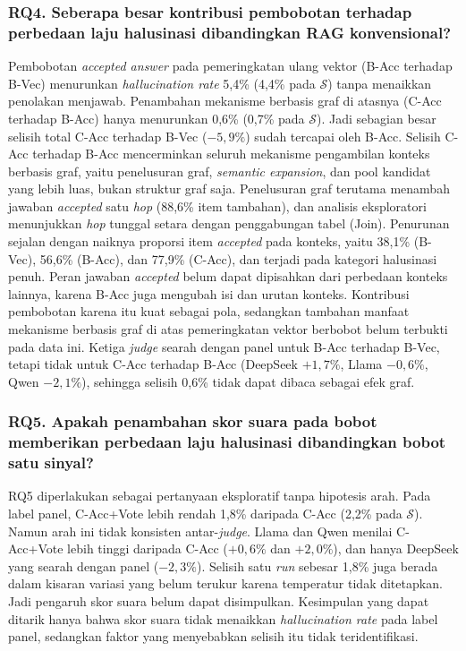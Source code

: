 \subsubsection*{RQ4. Seberapa besar kontribusi pembobotan terhadap perbedaan laju halusinasi dibandingkan RAG konvensional?}

Pembobotan \emph{accepted answer} pada pemeringkatan ulang vektor (B-Acc terhadap B-Vec) menurunkan \emph{hallucination rate} 5,4\% (4,4\% pada $\mathcal{S}$) tanpa menaikkan penolakan menjawab. Penambahan mekanisme berbasis graf di atasnya (C-Acc terhadap B-Acc) hanya menurunkan 0,6\% (0,7\% pada $\mathcal{S}$). Jadi sebagian besar selisih total C-Acc terhadap B-Vec ($-5{,}9\%$) sudah tercapai oleh B-Acc. Selisih C-Acc terhadap B-Acc mencerminkan seluruh mekanisme pengambilan konteks berbasis graf, yaitu penelusuran graf, \emph{semantic expansion}, dan pool kandidat yang lebih luas, bukan struktur graf saja. Penelusuran graf terutama menambah jawaban \emph{accepted} satu \emph{hop} (88,6\% item tambahan), dan analisis eksploratori menunjukkan \emph{hop} tunggal setara dengan penggabungan tabel (Join). Penurunan sejalan dengan naiknya proporsi item \emph{accepted} pada konteks, yaitu 38,1\% (B-Vec), 56,6\% (B-Acc), dan 77,9\% (C-Acc), dan terjadi pada kategori halusinasi penuh. Peran jawaban \emph{accepted} belum dapat dipisahkan dari perbedaan konteks lainnya, karena B-Acc juga mengubah isi dan urutan konteks. Kontribusi pembobotan karena itu kuat sebagai pola, sedangkan tambahan manfaat mekanisme berbasis graf di atas pemeringkatan vektor berbobot belum terbukti pada data ini. Ketiga \emph{judge} searah dengan panel untuk B-Acc terhadap B-Vec, tetapi tidak untuk C-Acc terhadap B-Acc (DeepSeek $+1{,}7\%$, Llama $-0{,}6\%$, Qwen $-2{,}1\%$), sehingga selisih 0,6\% tidak dapat dibaca sebagai efek graf.

\subsubsection*{RQ5. Apakah penambahan skor suara pada bobot memberikan perbedaan laju halusinasi dibandingkan bobot satu sinyal?}

RQ5 diperlakukan sebagai pertanyaan eksploratif tanpa hipotesis arah. Pada label panel, C-Acc+Vote lebih rendah 1,8\% daripada C-Acc (2,2\% pada $\mathcal{S}$). Namun arah ini tidak konsisten antar-\emph{judge}. Llama dan Qwen menilai C-Acc+Vote lebih tinggi daripada C-Acc ($+0{,}6\%$ dan $+2{,}0\%$), dan hanya DeepSeek yang searah dengan panel ($-2{,}3\%$). Selisih satu \emph{run} sebesar 1,8\% juga berada dalam kisaran variasi yang belum terukur karena temperatur tidak ditetapkan. Jadi pengaruh skor suara belum dapat disimpulkan. Kesimpulan yang dapat ditarik hanya bahwa skor suara tidak menaikkan \emph{hallucination rate} pada label panel, sedangkan faktor yang menyebabkan selisih itu tidak teridentifikasi.

